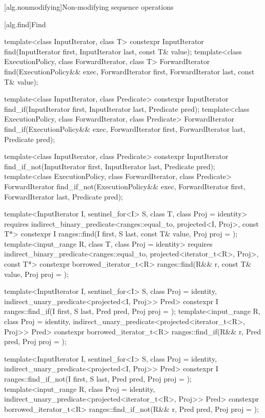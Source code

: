[alg.nonmodifying]{Non-modifying sequence operations}

\setcounter{subsection}{4}
[alg.find]{Find}

%
%
%
\begin{itemdecl}
template<class InputIterator, class T>
  constexpr InputIterator find(InputIterator first, InputIterator last,
                               const T& value);
template<class ExecutionPolicy, class ForwardIterator, class T>
  ForwardIterator find(ExecutionPolicy&& exec, ForwardIterator first, ForwardIterator last,
                       const T& value);

template<class InputIterator, class Predicate>
  constexpr InputIterator find_if(InputIterator first, InputIterator last,
                                  Predicate pred);
template<class ExecutionPolicy, class ForwardIterator, class Predicate>
  ForwardIterator find_if(ExecutionPolicy&& exec, ForwardIterator first, ForwardIterator last,
                          Predicate pred);

template<class InputIterator, class Predicate>
  constexpr InputIterator find_if_not(InputIterator first, InputIterator last,
                                      Predicate pred);
template<class ExecutionPolicy, class ForwardIterator, class Predicate>
  ForwardIterator find_if_not(ExecutionPolicy&& exec,
                              ForwardIterator first, ForwardIterator last,
                              Predicate pred);

template<InputIterator I, sentinel_for<I> S, class T, class Proj = identity>
 requires indirect_binary_predicate<ranges::equal_to, projected<I, Proj>, const T*>
 constexpr I ranges::find(I first, S last, const T& value, Proj proj = {});
template<input_range R, class T, class Proj = identity>
 requires indirect_binary_predicate<ranges::equal_to, projected<iterator_t<R>, Proj>, const T*>
 constexpr borrowed_iterator_t<R>
   ranges::find(R&& r, const T& value, Proj proj = {});

template<InputIterator I, sentinel_for<I> S, class Proj = identity,
         indirect_unary_predicate<projected<I, Proj>> Pred>
  constexpr I ranges::find_if(I first, S last, Pred pred, Proj proj = {});
template<input_range R, class Proj = identity,
         indirect_unary_predicate<projected<iterator_t<R>, Proj>> Pred>
 constexpr borrowed_iterator_t<R>
   ranges::find_if(R&& r, Pred pred, Proj proj = {});

template<InputIterator I, sentinel_for<I> S, class Proj = identity,
         indirect_unary_predicate<projected<I, Proj>> Pred>
 constexpr I ranges::find_if_not(I first, S last, Pred pred, Proj proj = {});
template<input_range R, class Proj = identity,
         indirect_unary_predicate<projected<iterator_t<R>, Proj>> Pred>
 constexpr borrowed_iterator_t<R>
   ranges::find_if_not(R&& r, Pred pred, Proj proj = {});
\end{itemdecl}

